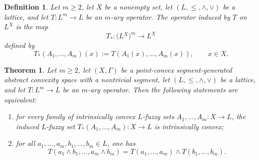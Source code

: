 \documentclass[11pt,a4paper]{article}
\newtheorem{theorem}{Theorem}
\newtheorem{definition}{Definition}
\begin{document}
\begin{definition}\label{def_induced_operator}
Let \(m\geq 2\), let \(X\) be a nonempty set, let \((L,\leq,\wedge,\vee)\) be a lattice, and let \(T:L^m\to L\) be an \(m\)-ary operator. The \emph{operator induced by \(T\)} on \(L^X\) is the map
\[
T_*:\big(L{^X}\big)^{m} \to L^X
\]
defined by
\[
T_*(A_1,\dots,A_m)(x):=T(A_1(x),\dots,A_m(x)),
\qquad x\in X.
\]
\end{definition}

\begin{theorem}\label{teo_sharp_induced}
Let \(m\geq 2\), let \((X,\Gamma)\) be a point-convex segment-generated abstract convexity space with a nontrivial segment, let \((L,\leq,\wedge,\vee)\) be a lattice, and let \(T:L^m\to L\) be an \(m\)-ary operator. Then the following statements are equivalent:
\begin{enumerate}
    \item for every family of intrinsically convex \(L\)-fuzzy sets \(A_1,\dots,A_m:X\to L\), the induced \(L\)-fuzzy set \(T_*(A_1,\dots,A_m):X\to L\) is intrinsically convex;
    \item for all \(a_1,\dots,a_m,b_1,\dots,b_m\in L\), one has
    \[
    T(a_1\wedge b_1,\dots,a_m\wedge b_m)
    =
    T(a_1,\dots,a_m)\wedge T(b_1,\dots,b_m).
    \]
\end{enumerate}
\end{theorem}
\end{document}
